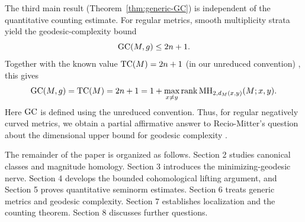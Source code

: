 The third main result (Theorem~\ref{thm:generic-GC}) is independent
of the quantitative counting estimate. For regular metrics,
smooth multiplicity strata yield the
geodesic-complexity bound
\[
 \text{GC}(M,g)\leq 2n+1.
\]
Together with the known value $\text{TC}(M)=2n+1$
(in our unreduced convention) \cite{Dranishnikov2020}, this gives
\[
 \text{GC}(M,g)=\text{TC}(M)=2n+1
 =1+\max_{x\ne y}\operatorname{rank}
 \mathrm{MH}_{2,d_M(x,y)}(M;x,y).
\]
Here $\text{GC}$ is defined using the unreduced convention.
Thus, for regular negatively curved metrics, we obtain a partial
affirmative answer to Recio-Mitter's question about the dimensional
upper bound for geodesic complexity
\cite[Section~8, Question~1]{RecioMitter2021}.

The remainder of the paper is organized as follows. Section 2 studies canonical classes and magnitude homology.
Section 3 introduces the minimizing-geodesic nerve.
Section 4 develops the bounded cohomological lifting argument,
and Section 5 proves quantitative seminorm estimates.
Section 6 treats generic metrics and geodesic complexity.
Section 7 establishes localization and the counting theorem.
Section 8 discusses further questions.

